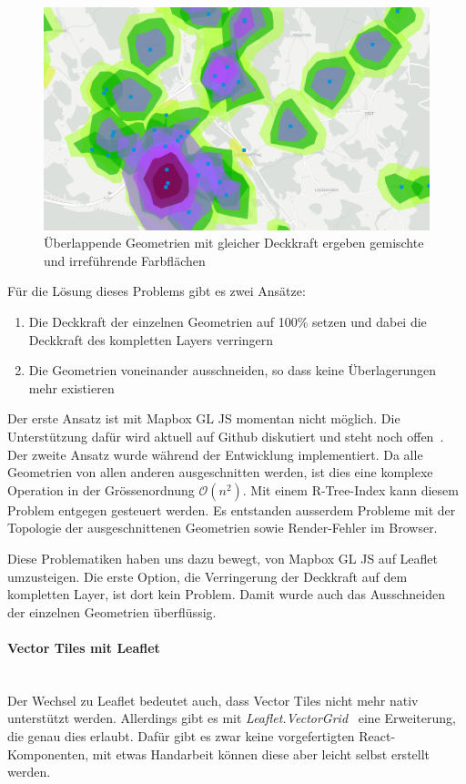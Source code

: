 \begin{figure}[ht]
    \centering
    \includegraphics[width=0.8\linewidth]{projectdoc/img/problem_overlapping_isochrones}
    \caption[Problematik von sich überlappenden Geometrien mit gleicher Deckkraft]{Überlappende Geometrien mit gleicher Deckkraft ergeben gemischte und irreführende Farbflächen}
    \label{fig:problem_overlapping_isochrones}
\end{figure}

Für die Lösung dieses Problems gibt es zwei Ansätze:

\begin{enumerate}
    \item Die Deckkraft der einzelnen Geometrien auf 100\% setzen und dabei die Deckkraft des kompletten Layers verringern
    \item Die Geometrien voneinander ausschneiden, so dass keine Überlagerungen mehr existieren
\end{enumerate}

Der erste Ansatz ist mit Mapbox GL JS momentan nicht möglich.
Die Unterstützung dafür wird aktuell auf Github diskutiert und steht noch offen~\cite{mapbox_layer_opacity}.
Der zweite Ansatz wurde während der Entwicklung implementiert.
Da alle Geometrien von allen anderen ausgeschnitten werden, ist dies eine komplexe Operation in der Grössenordnung $\mathcal{O}(n^2)$.
Mit einem R-Tree-Index kann diesem Problem entgegen gesteuert werden.
Es entstanden ausserdem Probleme mit der Topologie der ausgeschnittenen Geometrien sowie Render-Fehler im Browser.

Diese Problematiken haben uns dazu bewegt, von Mapbox GL JS auf Leaflet umzusteigen.
Die erste Option, die Verringerung der Deckkraft auf dem kompletten Layer, ist dort kein Problem.
Damit wurde auch das Ausschneiden der einzelnen Geometrien überflüssig.

\paragraph{Vector Tiles mit Leaflet}~\\
Der Wechsel zu Leaflet bedeutet auch, dass Vector Tiles nicht mehr nativ unterstützt werden.
Allerdings gibt es mit \emph{Leaflet.VectorGrid}~\cite{leaflet_vector_grid} eine Erweiterung, die genau dies erlaubt.
Dafür gibt es zwar keine vorgefertigten React-Komponenten, mit etwas Handarbeit können diese aber leicht selbst erstellt werden.


